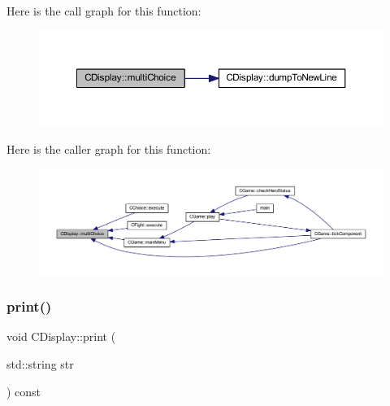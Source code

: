 Here is the call graph for this function\+:\nopagebreak
\begin{figure}[H]
\begin{center}
\leavevmode
\includegraphics[width=350pt]{class_c_display_a7d4efb0285d6cdf757bc34e38718e17d_cgraph}
\end{center}
\end{figure}
Here is the caller graph for this function\+:\nopagebreak
\begin{figure}[H]
\begin{center}
\leavevmode
\includegraphics[width=350pt]{class_c_display_a7d4efb0285d6cdf757bc34e38718e17d_icgraph}
\end{center}
\end{figure}
\mbox{\label{class_c_display_a54c5d36f4bc11d4a935ff5c86ea4e653}} 
\subsubsection{\texorpdfstring{print()}{print()}}
{\footnotesize\ttfamily void C\+Display\+::print (\begin{DoxyParamCaption}\item[{std\+::string}]{str }\end{DoxyParamCaption}) const}

